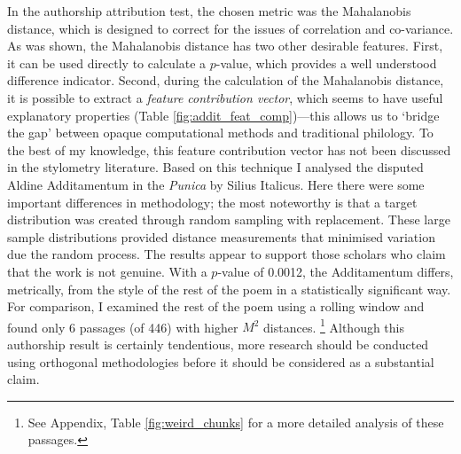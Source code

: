 \documentclass[11pt,a4paper]{scrartcl} %
\begin{document}
{In the authorship attribution test, the chosen metric was the Mahalanobis distance, which is designed to correct for the issues of correlation and co-variance. As was shown, the Mahalanobis distance has two other desirable features. First, it can be used directly to calculate a $p$-value, which provides a well understood difference indicator. Second, during the calculation of the Mahalanobis distance, it is possible to extract a \textit{feature contribution vector}, which seems to have useful explanatory properties (Table \ref{fig:addit_feat_comp})---this allows us to `bridge the gap' between opaque computational methods and traditional philology. To the best of my knowledge, this feature contribution vector has not been discussed in the stylometry literature. Based on this technique I analysed the disputed Aldine Additamentum in the \textit{Punica} by Silius Italicus. Here there were some important differences in methodology; the most noteworthy is that a target distribution was created through random sampling with replacement. These large sample distributions provided distance measurements that minimised variation due the random process. The results appear to support those scholars who claim that the work is not genuine. With a $p$-value of 0.0012, the Additamentum differs, metrically, from the style of the rest of the poem in a statistically significant way. For comparison, I examined the rest of the poem using a rolling window and found only 6 passages (of 446) with higher $M^{2}$ distances.%
\footnote{See Appendix, Table \ref{fig:weird_chunks} for a more detailed analysis of these passages.}
Although this authorship result is certainly tendentious, more research should be conducted using orthogonal methodologies before it should be considered as a substantial claim.
\newpage


\newpage
}
\end{document}
